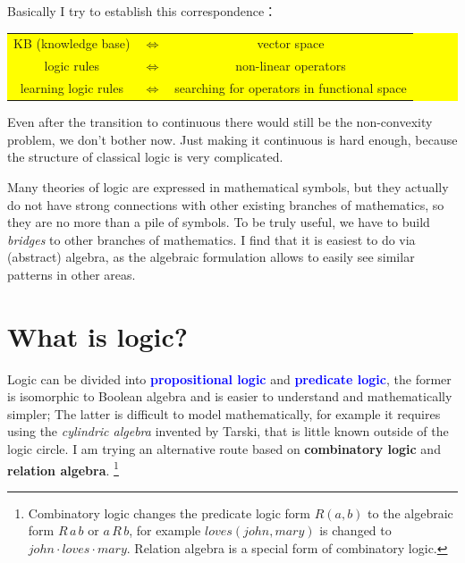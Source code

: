 \documentclass[12pt]{article}
\newcommand{\concept}[1]{\textbf{\textcolor{blue}{#1}}}
\begin{document}
Basically I try to establish this correspondence：
\begin{center}
\colorbox{yellow}{\parbox{0.95\textwidth}{
\begin{tabular}{ccc}
KB (knowledge base) & $\Leftrightarrow$ & vector space \\
logic rules & $\Leftrightarrow$ & non-linear operators \\
learning logic rules & $\Leftrightarrow$ & searching for operators in functional space \\ 
\end{tabular}
}}
\end{center}

Even after the transition to continuous there would still be the non-convexity problem, we don't bother now.  Just making it continuous is hard enough, because the structure of classical logic is very complicated.

Many theories of logic are expressed in mathematical symbols, but they actually do not have strong connections with other existing branches of mathematics, so they are no more than a pile of symbols.  To be truly useful, we have to build \textit{bridges} to other branches of mathematics.  I find that it is easiest to do via (abstract) algebra, as the algebraic formulation allows to easily see similar patterns in other areas.

\section{What is logic?}

Logic can be divided into \concept{propositional logic} and \concept{predicate logic}, the former is isomorphic to Boolean algebra and is easier to understand and mathematically simpler;  The latter is difficult to model mathematically, for example it requires using the \textit{cylindric algebra} invented by Tarski, that is little known outside of the logic circle.  I am trying an alternative route based on \textbf{combinatory logic} and \textbf{relation algebra}. \footnote{Combinatory logic changes the predicate logic form $R(a, b)$ to the algebraic form $R \,a\, b$ or $a \,R\, b$, for example $loves(john, mary)$ is changed to $john \cdot loves \cdot mary$.  Relation algebra is a special form of combinatory logic.}

\end{document}
